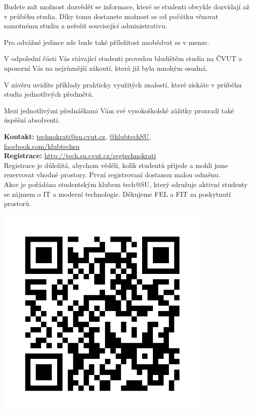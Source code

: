 \documentclass[12pt]{extarticle}[10.3.2013]
\makeatletter
\newcommand{\B}[1]{\textbf{{#1}}}
\newcommand{\techSU}{tech@SU}
\makeatother
\begin{document}
Budete mít možnost dozvědět se informace, které se studenti obvykle
dozvídají až v průběhu studia. Díky tomu dostanete možnost se od
počátku věnovat samotnému studiu a neřešit související administrativu.

Pro odvážné jedince zde bude také příležitost naobědvat se v menze.

V odpolední části Vás stávající studenti provedou bludištěm studia na
ČVUT a upozorní Vás na nejrůznější zákoutí, která již byla mnohým osudná.

V závěru uvidíte příklady prakticky využitých znalostí, které získáte v
průběhu studia jednotlivých předmětů.

Mezi jednotlivými přednáškami Vám své vysokoškolské zážitky prozradí
také úspěšní absolventi.

\vspace{3em}

\begin{minipage}[c]{0.5\textwidth}
\B{Kontakt:} \href{mailto:technokrati@su.cvut.cz}{technokrati@su.cvut.cz}, \href{https://twitter.com/klubtechsu}{@klubtechSU}, \\ \href{https://facebook.com/klubtechsu}{facebook.com/klubtechsu} \\

\B{Registrace:} \href{http://tech.su.cvut.cz/regtechnokrati}{http://tech.su.cvut.cz/regtechnokrati} \\
Registrace je důležitá, abychom věděli, kolik studentů přijede a mohli jsme rezervovat vhodné prostory. První registrovaní dostanou malou odměnu. \\

Akce je pořádána studentským klubem \techSU, který sdružuje aktivní studenty se zájmem o IT a moderní technologie. Děkujeme FEL a FIT za poskytnutí prostorů.
\end{minipage}
\begin{minipage}[c]{0.5\textwidth}
\begin{center}
	{\includegraphics[width=0.8\textwidth]{reg-odkaz.png}}
\end{center}
\end{minipage}
\end{document}
